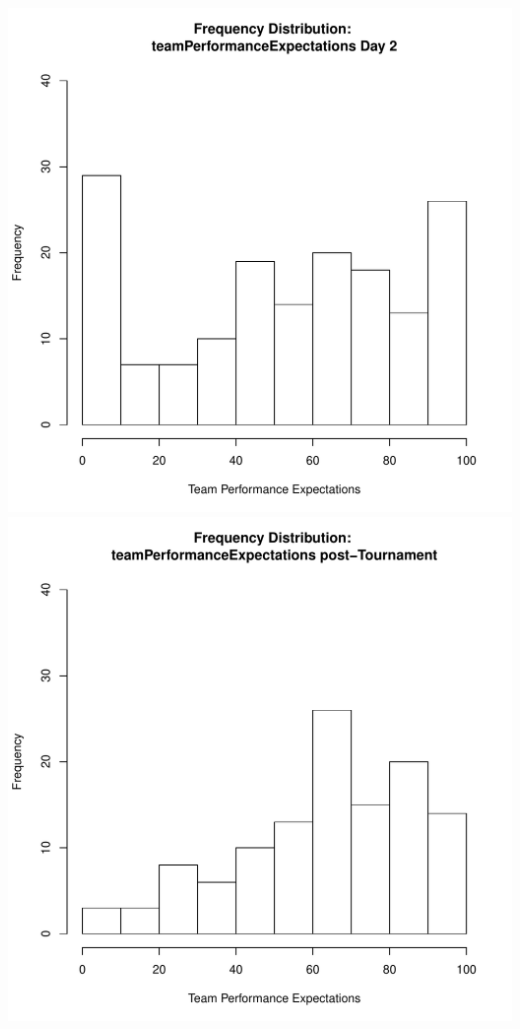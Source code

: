 \documentclass[12pt]{report}
\begin{document}
\includegraphics[scale =.4]{../images/distTeamPerfExpDay2.pdf}
\includegraphics[scale =.4]{../images/distTeamPerfExpPost.pdf}
\clearpage
\end{document}
